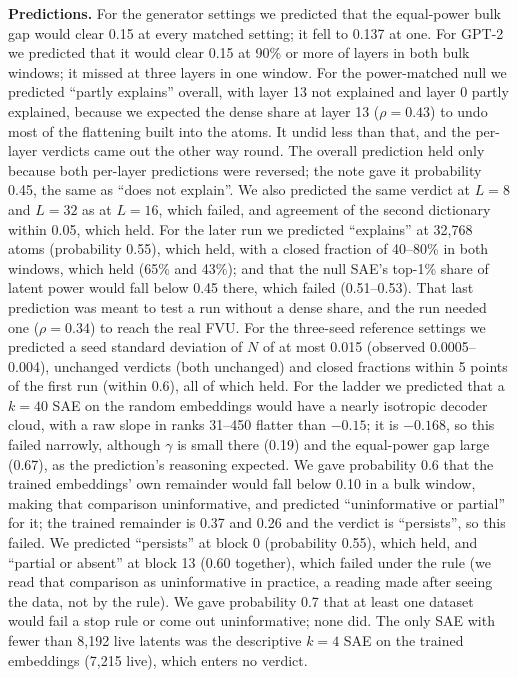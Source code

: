 \documentclass[10pt,twocolumn]{article}
\begin{document}
\textbf{Predictions.} For the generator settings we predicted that the equal-power bulk gap would clear 0.15 at every matched setting; it fell to 0.137 at one. For GPT-2 we predicted that it would clear 0.15 at 90\% or more of layers in both bulk windows; it missed at three layers in one window. For the power-matched null we predicted ``partly explains'' overall, with layer 13 not explained and layer 0 partly explained, because we expected the dense share at layer 13 ($\rho=0.43$) to undo most of the flattening built into the atoms. It undid less than that, and the per-layer verdicts came out the other way round. The overall prediction held only because both per-layer predictions were reversed; the note gave it probability 0.45, the same as ``does not explain''. We also predicted the same verdict at $L=8$ and $L=32$ as at $L=16$, which failed, and agreement of the second dictionary within 0.05, which held. For the later run we predicted ``explains'' at 32,768 atoms (probability 0.55), which held, with a closed fraction of 40--80\% in both windows, which held (65\% and 43\%); and that the null SAE's top-1\% share of latent power would fall below 0.45 there, which failed (0.51--0.53). That last prediction was meant to test a run without a dense share, and the run needed one ($\rho=0.34$) to reach the real FVU. For the three-seed reference settings we predicted a seed standard deviation of $N$ of at most 0.015 (observed 0.0005--0.004), unchanged verdicts (both unchanged) and closed fractions within 5 points of the first run (within 0.6), all of which held. For the ladder we predicted that a $k=40$ SAE on the random embeddings would have a nearly isotropic decoder cloud, with a raw slope in ranks 31--450 flatter than $-0.15$; it is $-0.168$, so this failed narrowly, although $\gamma$ is small there (0.19) and the equal-power gap large (0.67), as the prediction's reasoning expected. We gave probability 0.6 that the trained embeddings' own remainder would fall below 0.10 in a bulk window, making that comparison uninformative, and predicted ``uninformative or partial'' for it; the trained remainder is 0.37 and 0.26 and the verdict is ``persists'', so this failed. We predicted ``persists'' at block 0 (probability 0.55), which held, and ``partial or absent'' at block 13 (0.60 together), which failed under the rule (we read that comparison as uninformative in practice, a reading made after seeing the data, not by the rule). We gave probability 0.7 that at least one dataset would fail a stop rule or come out uninformative; none did. The only SAE with fewer than 8,192 live latents was the descriptive $k=4$ SAE on the trained embeddings (7,215 live), which enters no verdict.
\end{document}
